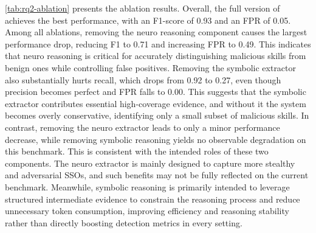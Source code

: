 \begin{table}[t]
\centering
\caption{Ablation study of \toolname with 4 variants.}
\label{tab:rq2-ablation}
\end{table}

\autoref{tab:rq2-ablation} presents the ablation results. Overall, the full version of \toolname achieves the best performance, with an F1-score of 0.93 and an FPR of 0.05. Among all ablations, removing the neuro reasoning component causes the largest performance drop, reducing F1 to 0.71 and increasing FPR to 0.49. This indicates that neuro reasoning is critical for accurately distinguishing malicious skills from benign ones while controlling false positives.
Removing the symbolic extractor also substantially hurts recall, which drops from 0.92 to 0.27, even though precision becomes perfect and FPR falls to 0.00. This suggests that the symbolic extractor contributes essential high-coverage evidence, and without it the system becomes overly conservative, identifying only a small subset of malicious skills.
In contrast, removing the neuro extractor leads to only a minor performance decrease, while removing symbolic reasoning yields no observable degradation on this benchmark. This is consistent with the intended roles of these two components. The neuro extractor is mainly designed to capture more stealthy and adversarial SSOs, and such benefits may not be fully reflected on the current benchmark. Meanwhile, symbolic reasoning is primarily intended to leverage structured intermediate evidence to constrain the reasoning process and reduce unnecessary token consumption, improving efficiency and reasoning stability rather than directly boosting detection metrics in every setting.

